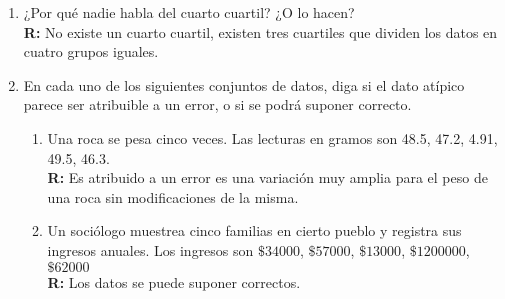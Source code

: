 \documentclass[10pt,a4paper]{book}
\begin{document}
\begin{enumerate}
	\item ¿Por qué nadie habla del cuarto cuartil? ¿O lo hacen?\\
	\textbf{R:} No existe un cuarto cuartil, existen tres cuartiles que dividen los datos en cuatro grupos iguales.
	
	\item En cada uno de los siguientes conjuntos de datos, diga si el dato atípico parece ser atribuible a un error, o si se podrá suponer correcto.
	\begin{enumerate}
		\item Una roca se pesa cinco veces. Las lecturas en gramos son 48.5, 47.2, 4.91, 49.5, 46.3.\\
		\textbf{R:} Es atribuido a un error es una variación muy amplia para el peso de una roca sin modificaciones de la misma.
		
		\item Un sociólogo muestrea cinco familias en cierto pueblo y registra sus ingresos anuales. Los ingresos son $ \$34000 $, $ \$ 57000 $, $ \$13000 $, $ \$1200000 $, $ \$62000 $\\
		\textbf{R:}  Los datos se puede suponer correctos.
	\end{enumerate}
	
	
\end{enumerate}
\end{document}
